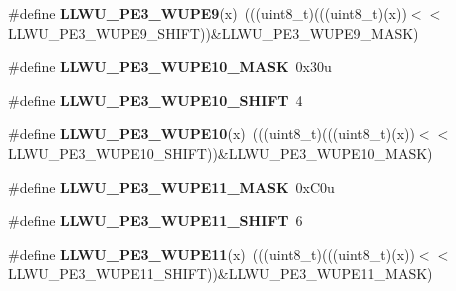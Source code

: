 \begin{DoxyCompactItemize}
\item 
\#define {\bfseries L\+L\+W\+U\+\_\+\+P\+E3\+\_\+\+W\+U\+P\+E9}(x)~(((uint8\+\_\+t)(((uint8\+\_\+t)(x))$<$$<$L\+L\+W\+U\+\_\+\+P\+E3\+\_\+\+W\+U\+P\+E9\+\_\+\+S\+H\+I\+FT))\&L\+L\+W\+U\+\_\+\+P\+E3\+\_\+\+W\+U\+P\+E9\+\_\+\+M\+A\+SK)\hypertarget{group__LLWU__Register__Masks_ga644ab845edd61fbd851fca7254c6a3f0}{}\label{group__LLWU__Register__Masks_ga644ab845edd61fbd851fca7254c6a3f0}

\item 
\#define {\bfseries L\+L\+W\+U\+\_\+\+P\+E3\+\_\+\+W\+U\+P\+E10\+\_\+\+M\+A\+SK}~0x30u\hypertarget{group__LLWU__Register__Masks_ga6d8e812233df26a72459712117996efa}{}\label{group__LLWU__Register__Masks_ga6d8e812233df26a72459712117996efa}

\item 
\#define {\bfseries L\+L\+W\+U\+\_\+\+P\+E3\+\_\+\+W\+U\+P\+E10\+\_\+\+S\+H\+I\+FT}~4\hypertarget{group__LLWU__Register__Masks_ga1686c8515045158eeef3fc0c5df480d9}{}\label{group__LLWU__Register__Masks_ga1686c8515045158eeef3fc0c5df480d9}

\item 
\#define {\bfseries L\+L\+W\+U\+\_\+\+P\+E3\+\_\+\+W\+U\+P\+E10}(x)~(((uint8\+\_\+t)(((uint8\+\_\+t)(x))$<$$<$L\+L\+W\+U\+\_\+\+P\+E3\+\_\+\+W\+U\+P\+E10\+\_\+\+S\+H\+I\+FT))\&L\+L\+W\+U\+\_\+\+P\+E3\+\_\+\+W\+U\+P\+E10\+\_\+\+M\+A\+SK)\hypertarget{group__LLWU__Register__Masks_ga5ba778d142ba95753b9eec4e9c5e73f6}{}\label{group__LLWU__Register__Masks_ga5ba778d142ba95753b9eec4e9c5e73f6}

\item 
\#define {\bfseries L\+L\+W\+U\+\_\+\+P\+E3\+\_\+\+W\+U\+P\+E11\+\_\+\+M\+A\+SK}~0x\+C0u\hypertarget{group__LLWU__Register__Masks_gad46cfb926e4e6bbc0cba079fb07a2bfd}{}\label{group__LLWU__Register__Masks_gad46cfb926e4e6bbc0cba079fb07a2bfd}

\item 
\#define {\bfseries L\+L\+W\+U\+\_\+\+P\+E3\+\_\+\+W\+U\+P\+E11\+\_\+\+S\+H\+I\+FT}~6\hypertarget{group__LLWU__Register__Masks_gad8a60b9eab4fe9a0c559bae94033ca1e}{}\label{group__LLWU__Register__Masks_gad8a60b9eab4fe9a0c559bae94033ca1e}

\item 
\#define {\bfseries L\+L\+W\+U\+\_\+\+P\+E3\+\_\+\+W\+U\+P\+E11}(x)~(((uint8\+\_\+t)(((uint8\+\_\+t)(x))$<$$<$L\+L\+W\+U\+\_\+\+P\+E3\+\_\+\+W\+U\+P\+E11\+\_\+\+S\+H\+I\+FT))\&L\+L\+W\+U\+\_\+\+P\+E3\+\_\+\+W\+U\+P\+E11\+\_\+\+M\+A\+SK)\hypertarget{group__LLWU__Register__Masks_ga73485bbb713aeb9b283996279ffdea6c}{}\label{group__LLWU__Register__Masks_ga73485bbb713aeb9b283996279ffdea6c}


\end{DoxyCompactItemize}
